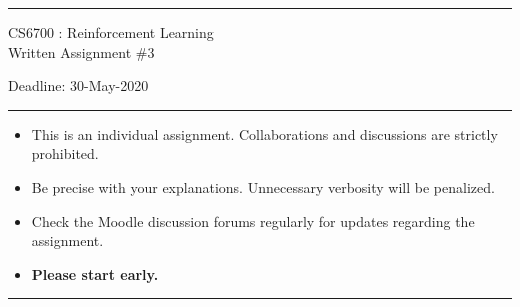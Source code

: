 \documentclass[solution,addpoints,12pt]{exam}
\begin{document}
\hrule
\vspace{1mm}
\noindent 
\begin{center}
{\Large CS6700 : Reinforcement Learning} \\
{\large Written Assignment \#3}
\end{center}
\vspace{1mm}
\noindent 
{\large \hfill Deadline: 30-May-2020}

\vspace{2mm}
\hrule

{\small

\begin{itemize}\itemsep0mm
\item This is an individual assignment. Collaborations and discussions are strictly
prohibited.
\item Be precise with your explanations. Unnecessary verbosity will be penalized.
\item Check the Moodle discussion forums regularly for updates regarding the assignment.
\item \textbf{Please start early.}
\end{itemize}
}

\hrule

\vspace{3mm}
  \\[1mm]
 \\
\end{document}

